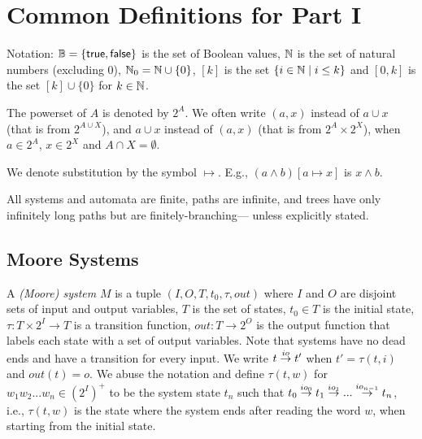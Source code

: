\newcommand{\nocontentsline}[3]{}
\newcommand{\toclesslab}[3]{\bgroup\let\addcontentsline=\nocontentsline#1{#2\label{#3}}\egroup}

\chapter{Common Definitions for Part I}\label{chap:defs}
Notation:
$\mathbb{B} = \{\textsf{true},\textsf{false}\}$ is the set of Boolean values,
$\mathbb{N}$ is the set of natural numbers (excluding $0$),
$\mathbb{N}_0 = \mathbb{N}\cup\{0\}$,
$[k]$ is the set $\{i \in \mathbb{N} \mid i \leq k\}$
and $[0,k]$ is the set $[k] \cup \{0\}$ for $k \in \mathbb{N}$.

The powerset of $A$ is denoted by $2^A$.
We often write $(a,x)$ instead of $a \cup x$ (that is from $2^{A \cup X}$),
and $a \cup x$ instead of $(a,x)$ (that is from $2^A \times 2^X$),
when $a \in 2^A$, $x \in 2^X$ and $A \cap X = \emptyset$.

We denote substitution by the symbol $\mapsto$.
E.g., $(a \land b) [a \mapsto x]$ is $x \land b$.

All systems and automata are finite,
paths are infinite,
and trees have only infinitely long paths but are finitely-branching---%
unless explicitly stated.


\toclesslab\section{Moore Systems}{defs:moore-systems}

A \emph{(Moore) system} $M$ is a tuple
$(I, O, T, t_0, \tau, out)$
where
$I$ and $O$ are disjoint sets of input and output variables,
$T$ is the set of states, $t_0 \in T$ is the initial state,
$\tau: T \times 2^I \to T$ is a transition function,
$out: T \to 2^O$ is the output function that
labels each state with a set of output variables.
Note that systems have no dead ends and have a transition for every input.
We write $t \stackrel{{io}}{\rightarrow} t'$ when $t' = \tau(t,i)$ and $out(t) = o$.
We abuse the notation and define $\tau(t,w)$ for $w_1 w_2 ... w_n \in (2^I)^+$
to be the system state $t_n$ such that $t_0 \stackrel{{io_0}}{\rightarrow} t_1 \stackrel{{io_1}}{\rightarrow} ... \stackrel{{io_{n-1}}}{\rightarrow} t_n$,
i.e., $\tau(t,w)$ is the state where the system ends after reading the word $w$,
when starting from the initial state.

